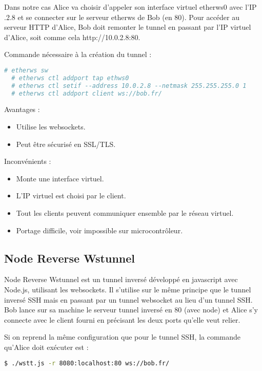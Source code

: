 Dans notre cas Alice va choisir d'appeler son interface virtuel \og etherws0 \fg avec l'IP .2.8 \fg et se connecter sur le serveur etherws de Bob (en 80). Pour accéder au serveur HTTP d'Alice, Bob doit remonter le tunnel en passant par l'IP virtuel d'Alice, soit comme cela http://10.0.2.8:80.

\noindent Commande nécessaire à la création du tunnel :
\begin{lstlisting}[language=bash]
  # etherws sw
  # etherws ctl addport tap ethws0
  # etherws ctl setif --address 10.0.2.8 --netmask 255.255.255.0 1
  # etherws ctl addport client ws://bob.fr/
\end{lstlisting}

Avantages :
\begin{itemize}
    \item Utilise les websockets.
    \item Peut être sécurisé en SSL/TLS.
\end{itemize}

Inconvénients :
\begin{itemize}
    \item Monte une interface virtuel.
    \item L'IP virtuel est choisi par le client.
    \item Tout les clients peuvent communiquer ensemble par le réseau virtuel.
    \item Portage difficile, voir impossible sur microcontrôleur.
\end{itemize}

\subsection{Node Reverse Wstunnel}

Node Reverse Wstunnel est un tunnel inversé développé en javascript avec Node.js, utilisant les websockets. Il s'utilise sur le même principe que le tunnel inversé SSH mais en passant par un tunnel websocket au lieu d'un tunnel SSH. Bob lance sur sa machine le serveur tunnel inversé en 80 (avec node) et Alice s'y connecte avec le client fourni en précisant les deux ports qu'elle veut relier.

\noindent Si on reprend la même configuration que pour le tunnel SSH, la commande qu'Alice doit exécuter est :
\begin{lstlisting}[language=bash]
  $ ./wstt.js -r 8080:localhost:80 ws://bob.fr/
\end{lstlisting}

